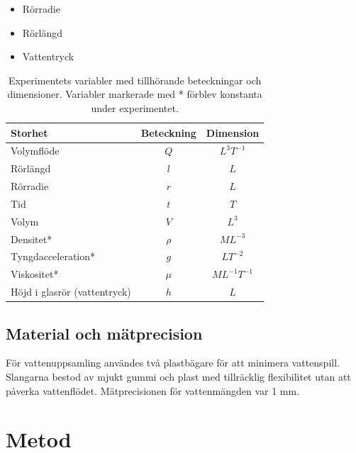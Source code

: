 \documentclass[a4paper,12pt]{article}
\begin{document}
%
\begin{itemize}
    \item Rörradie
    \item Rörlängd
    \item Vattentryck
\end{itemize}
%
\begin{table}[ht]
    \centering
    \begin{tabular}{|l|c|c|}
        \hline
        \textbf{Storhet} & \textbf{Beteckning} & \textbf{Dimension} \\
        \hline
        Volymflöde & $Q$ & $L^3T^{-1}$ \\
        Rörlängd & $l$ & $L$ \\
        Rörradie & $r$ & $L$ \\
        Tid & $t$ & $T$ \\
        Volym & $V$ & $L^3$ \\
        Densitet* & $\rho$ & $ML^{-3}$ \\
        Tyngdacceleration* & $g$ & $LT^{-2}$ \\
        Viskositet* & $\mu$ & $ML^{-1}T^{-1}$ \\
        Höjd i glasrör (vattentryck) & $h$ & $L$ \\
        \hline
    \end{tabular}
    \caption{Experimentets variabler med tillhörande beteckningar och dimensioner. 
             Variabler markerade med * förblev konstanta under experimentet.}
\end{table}
%
\subsection{Material och mätprecision}
För vattenuppsamling användes två plastbägare för att minimera vattenspill. 
Slangarna bestod av mjukt gummi och plast med tillräcklig flexibilitet utan 
att påverka vattenflödet. Mätprecisionen för vattenmängden var 1 mm.
%
\section{Metod}
%
\end{document}
